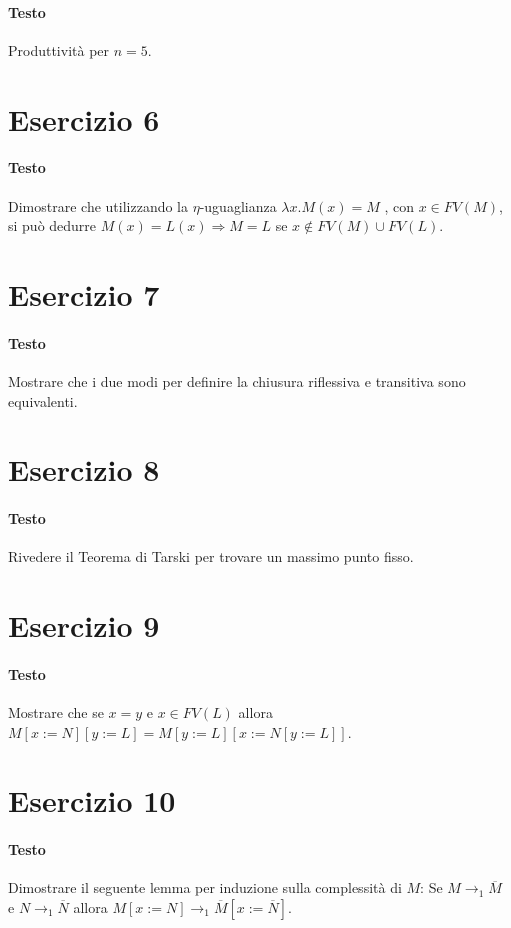 \documentclass[a4paper,11pt]{article}
\begin{document}
\paragraph{Testo}
Produttività per $n=5$.

\section*{Esercizio 6}
\paragraph{Testo}
Dimostrare che utilizzando la $\eta$-uguaglianza $\lambda x.M(x) = M$ , con $x \in FV(M)$, si può dedurre $M(x) = L(x) \Rightarrow M = L$ se $x \notin F V (M ) \cup F V (L)$.

\section*{Esercizio 7}
\paragraph{Testo}
Mostrare che i due modi per definire la chiusura riflessiva e transitiva sono equivalenti.

\section*{Esercizio 8}
\paragraph{Testo}
Rivedere il Teorema di Tarski per trovare un massimo punto fisso.

\section*{Esercizio 9}
\paragraph{Testo}
Mostrare che se $x = y$ e $x \in FV(L)$ allora $M [x := N ][y := L] = M [y := L][x :=N [y := L]]$.

\section*{Esercizio 10}
\paragraph{Testo}
Dimostrare il seguente lemma per induzione sulla complessità di $M$: Se $M \rightarrow_1 \overline{M}$ e $N \rightarrow_1 \overline{N}$ allora $M [x := N] \rightarrow_1 \overline{M} [x := \overline{N}]$.
\end{document}

